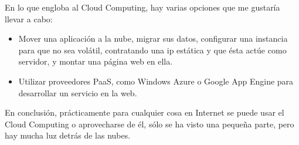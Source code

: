 \documentclass[runningheads]{llncs}
\begin{document}
En lo que engloba al Cloud Computing, hay varias opciones que me gustaría llevar a cabo:

\begin{itemize}
 \item Mover una aplicación a la nube, migrar sus datos, configurar una  instancia para que no sea volátil, contratando una ip estática  y que 
 ésta actúe como servidor, y montar una página web en ella. 
 \item Utilizar proveedores PaaS, como Windows Azure o Google App Engine para desarrollar un servicio en la web. 
\end{itemize}


En conclusión, prácticamente para cualquier cosa en Internet se puede usar el Cloud Computing o aprovecharse de él, sólo se ha visto 
una pequeña parte, pero hay mucha luz detrás de las nubes.





\end{document}

